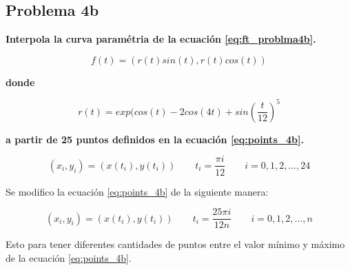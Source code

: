 \subsection*{Problema 4b}

\textbf{Interpola la curva paramétria de la ecuación \ref{eq:ft_problma4b}.}

\begin{equation}
	f(t) = (r(t)sin(t),r(t)cos(t)) \label{eq:ft_problma4b}
\end{equation}

\textbf{donde}

\begin{equation*}
	r(t) = exp(cos(t)-2cos(4t)+sin\left (\frac{t}{12}\right )^5
\end{equation*}

\textbf{a partir de 25 puntos definidos en la ecuación \ref{eq:points_4b}.}

\begin{equation}
	(x_i,y_i) = (x(t_i),y(t_i)) \qquad t_i = \frac{\pi i}{12} \qquad i=0,1,2,\dots,24 \label{eq:points_4b}
\end{equation}


Se modifico la ecuación \ref{eq:points_4b} de la siguiente manera:

\begin{equation}
	(x_i,y_i) = (x(t_i),y(t_i)) \qquad t_i = \frac{25\pi i}{12n} \qquad i=0,1,2,\dots,n \label{eq:points_4b_modificado}
\end{equation}

Esto para tener diferentes cantidades de puntos entre el valor mínimo y máximo de la ecuación \ref{eq:points_4b}.

